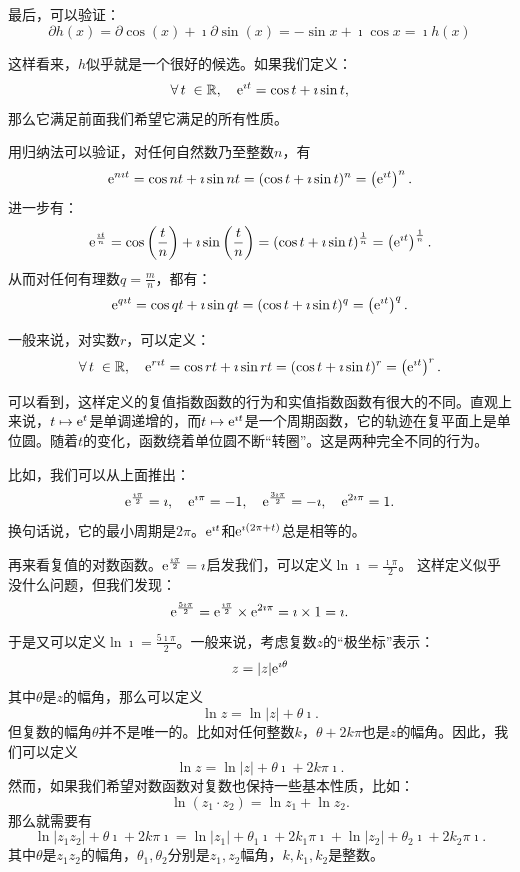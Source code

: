 \documentclass[12pt,UTF8,fontset=none]{ctexbook}
\begin{document}
最后，可以验证：
$$ \partial h(x) = \partial \cos{(x)} + \imath \partial \sin{(x)} = - \sin{x} + \imath \cos{x} = \imath h(x) $$

这样看来，$h$似乎就是一个很好的候选。如果我们定义：
$$ \forall \, t \; \in \mathbb{R}, \quad  \mathrm{e}^{\imath t} = \cos{t} + \imath \sin{t}, $$
那么它满足前面我们希望它满足的所有性质。

用归纳法可以验证，对任何自然数乃至整数$n$，有
$$ \mathrm{e}^{n\imath t} = \cos{nt} + \imath \sin{nt} = (\cos{t} + \imath \sin{t})^n = \left( \mathrm{e}^{\imath t} \right)^n. $$
进一步有：
$$ \mathrm{e}^{\frac{\imath t}{n}} = \cos{\left(\frac{t}{n}\right)} + \imath \sin{\left(\frac{t}{n}\right)} = (\cos{t} + \imath \sin{t})^{\frac{1}{n}} = \left( \mathrm{e}^{\imath t} \right)^{\frac{1}{n}}. $$
从而对任何有理数$q = \frac{m}{n}$，都有：
$$ \mathrm{e}^{q\imath t} = \cos{qt} + \imath \sin{qt} = (\cos{t} + \imath \sin{t})^q = \left( \mathrm{e}^{\imath t} \right)^q. $$

一般来说，对实数$r$，可以定义：
$$ \forall \, t \; \in \mathbb{R}, \quad \mathrm{e}^{r\imath t} = \cos{rt} + \imath \sin{rt} = (\cos{t} + \imath \sin{t})^r = \left( \mathrm{e}^{\imath t} \right)^r. $$

可以看到，这样定义的复值指数函数的行为和实值指数函数有很大的不同。直观上来说，$t\mapsto \mathrm{e}^{t}$是单调递增的，而$t\mapsto \mathrm{e}^{\imath t}$是一个周期函数，它的轨迹在复平面上是单位圆。随着$t$的变化，函数绕着单位圆不断“转圈”。这是两种完全不同的行为。

比如，我们可以从上面推出：
$$ \mathrm{e}^{\frac{\imath\pi}{2}} = \imath, \quad \mathrm{e}^{\imath\pi} = -1, \quad \mathrm{e}^{\frac{3\imath\pi}{2}} = -\imath, \quad \mathrm{e}^{2\imath\pi} = 1. $$
换句话说，它的最小周期是$2\pi$。$\mathrm{e}^{\imath t}$和$\mathrm{e}^{\imath(2\pi + t)}$总是相等的。

再来看复值的对数函数。$\mathrm{e}^{\frac{\imath\pi}{2}} = \imath$启发我们，可以定义$\ln{\imath} = \frac{\imath\pi}{2}$。
这样定义似乎没什么问题，但我们发现：
$$ \mathrm{e}^{\frac{5\imath\pi}{2}} = \mathrm{e}^{\frac{\imath\pi}{2}} \times \mathrm{e}^{2\imath\pi} = \imath \times 1 = \imath. $$
于是又可以定义$\ln{\imath} = \frac{5\imath\pi}{2}$。一般来说，考虑复数$z$的“极坐标”表示：
$$ z = |z| \mathrm{e}^{\imath \theta}$$
其中$\theta$是$z$的幅角，那么可以定义
$$\ln{z} = \ln{|z|} + \theta \imath.$$
但复数的幅角$\theta$并不是唯一的。比如对任何整数$k$，$\theta + 2k\pi$也是$z$的幅角。因此，我们可以定义
$$\ln{z} = \ln{|z|} + \theta \imath + 2k\pi\imath.$$
然而，如果我们希望对数函数对复数也保持一些基本性质，比如：
$$ \ln{(z_1 \cdot z_2)} = \ln{z_1} + \ln{z_2}. $$
那么就需要有
$$ \ln{|z_1z_2|} + \theta \imath + 2k\pi\imath = \ln{|z_1|} + \theta_1 \imath + 2k_1\pi\imath + \ln{|z_2|} + \theta_2 \imath + 2k_2\pi\imath.$$
其中$\theta$是$z_1z_2$的幅角，$\theta_1, \theta_2$分别是$z_1, z_2$幅角，$k, k_1, k_2$是整数。
\end{document}
